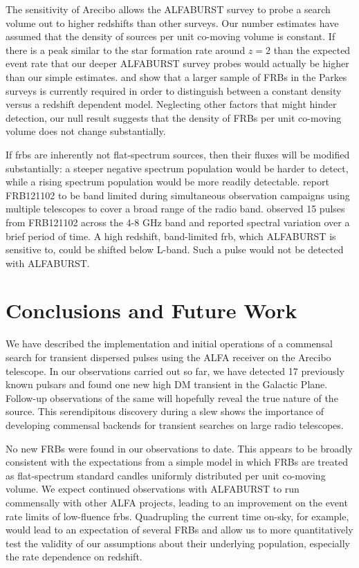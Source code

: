 \documentclass[a4paper,fleqn,usenatbib]{mnras}
\begin{document}
The sensitivity of Arecibo allows the ALFABURST survey to probe a search volume
out to higher redshifts than other surveys. Our number estimates have assumed
that the density of sources per unit co-moving volume is constant.  If there is
a peak similar to the star formation rate around $z=2$
\citep{2014ARA&A..52..415M} than the expected event rate that our deeper
ALFABURST survey probes would actually be higher than our simple estimates.
\citet{2016MNRAS.458..708C} and \citet{ranethesis} show that a larger sample of
FRBs in the Parkes surveys is currently required in order to distinguish
between a constant density versus a redshift dependent model. Neglecting other
factors that might hinder detection, our null result suggests that the density
of FRBs per unit co-moving volume does not change substantially.

If \glspl{frb} are inherently not flat-spectrum sources, then their fluxes will
be modified substantially: a steeper negative spectrum population would be harder to
detect, while a rising spectrum population would be more readily detectable.
\cite{2017arXiv170507553L} report FRB121102 to be band limited during
simultaneous observation campaigns using multiple telescopes to cover a broad
range of the radio band. \cite{atel10675} observed 15 pulses from FRB121102
across the 4-8 GHz band and reported spectral variation over a brief period of
time. A high redshift, band-limited \gls{frb}, which ALFABURST is sensitive to,
could be shifted below L-band. Such a pulse would not be detected with
ALFABURST.

\section{Conclusions and Future Work}
\label{sec:future_work}

We have described the implementation and initial operations of a commensal
search for transient dispersed pulses using the ALFA receiver on the Arecibo
telescope. In our observations carried out so far, we have detected 17
previously known pulsars and found one new  high DM transient in the Galactic
Plane.  Follow-up observations of the same will hopefully reveal the true nature of the
source. This serendipitous discovery during a slew shows the importance of
developing commensal backends for transient searches on large radio telescopes.

No new FRBs were found in our observations to date. This appears to be broadly
consistent with the expectations from a simple model in which FRBs are treated
as flat-spectrum standard candles uniformly distributed per unit co-moving
volume. We expect continued observations with ALFABURST to run commensally with
other ALFA projects, leading to an improvement on the event rate limits of
low-fluence \glspl{frb}. Quadrupling the current time on-sky, for example,
would lead to an expectation of several FRBs and allow us to more
quantitatively test the validity of our assumptions about their underlying
population, especially the rate dependence on redshift.
\end{document}
